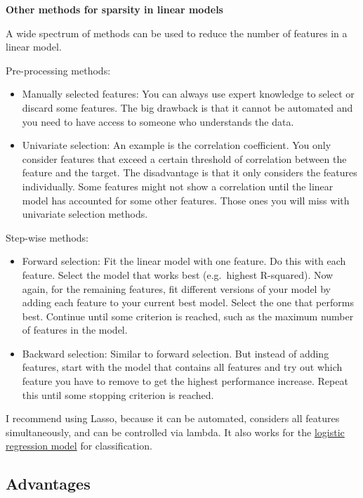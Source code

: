 \documentclass[
  12pt,
]{krantz}
\providecommand{\tightlist}{%
  \setlength{\itemsep}{0pt}\setlength{\parskip}{0pt}}
\begin{document}
\textbf{Other methods for sparsity in linear models}

A wide spectrum of methods can be used to reduce the number of features in a linear model.

Pre-processing methods:

\begin{itemize}
\tightlist
\item
  Manually selected features:
  You can always use expert knowledge to select or discard some features.
  The big drawback is that it cannot be automated and you need to have access to someone who understands the data.
\item
  Univariate selection:
  An example is the correlation coefficient.
  You only consider features that exceed a certain threshold of correlation between the feature and the target.
  The disadvantage is that it only considers the features individually.
  Some features might not show a correlation until the linear model has accounted for some other features.
  Those ones you will miss with univariate selection methods.
\end{itemize}

Step-wise methods:

\begin{itemize}
\tightlist
\item
  Forward selection:
  Fit the linear model with one feature.
  Do this with each feature.
  Select the model that works best (e.g.~highest R-squared).
  Now again, for the remaining features, fit different versions of your model by adding each feature to your current best model.
  Select the one that performs best.
  Continue until some criterion is reached, such as the maximum number of features in the model.
\item
  Backward selection:
  Similar to forward selection.
  But instead of adding features, start with the model that contains all features and try out which feature you have to remove to get the highest performance increase.
  Repeat this until some stopping criterion is reached.
\end{itemize}

I recommend using Lasso, because it can be automated, considers all features simultaneously, and can be controlled via lambda.
It also works for the \protect\hyperlink{logistic}{logistic regression model} for classification.

\hypertarget{advantages}{%
\subsection{Advantages}\label{advantages}}
\end{document}
